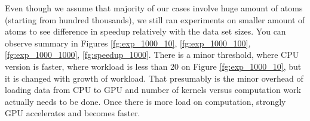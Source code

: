 \documentclass[12pt,letterpaper]{report}
\begin{document}
\noindent\hspace{3em} Even though we assume that majority of our cases involve huge amount of atoms (starting from hundred thousands), we still ran experiments on smaller amount of atoms to see difference in speedup relatively with the data set sizes. You can observe summary in Figures \ref{fg:exp_1000_10}, \ref{fg:exp_1000_100}, \ref{fg:exp_1000_1000}, \ref{fg:speedup_1000}. There is a minor threshold, where CPU version is faster, where workload is less than 20 on Figure \ref{fg:exp_1000_10}, but it is changed with growth of workload. That presumably is the minor overhead of loading data from CPU to GPU and number of kernels versus computation work actually needs to be done. Once there is more load on computation, strongly GPU accelerates and becomes faster.

\clearpage
\end{document}
